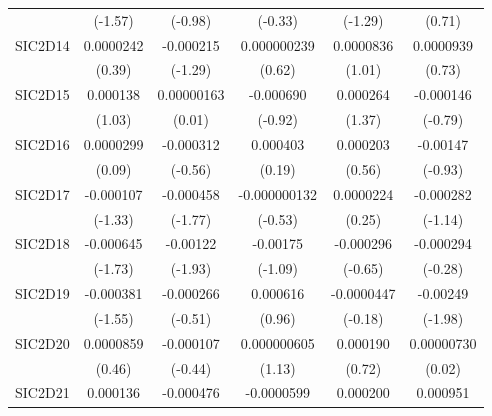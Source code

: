 \begin{table}[htbp]
\begin{tabular}{l*{5}{c}}
            &     (-1.57)         &     (-0.98)         &     (-0.33)         &     (-1.29)         &      (0.71)         \\
SIC2D14     &   0.0000242         &   -0.000215         & 0.000000239         &   0.0000836         &   0.0000939         \\
            &      (0.39)         &     (-1.29)         &      (0.62)         &      (1.01)         &      (0.73)         \\
SIC2D15     &    0.000138         &  0.00000163         &   -0.000690         &    0.000264         &   -0.000146         \\
            &      (1.03)         &      (0.01)         &     (-0.92)         &      (1.37)         &     (-0.79)         \\
SIC2D16     &   0.0000299         &   -0.000312         &    0.000403         &    0.000203         &    -0.00147         \\
            &      (0.09)         &     (-0.56)         &      (0.19)         &      (0.56)         &     (-0.93)         \\
SIC2D17     &   -0.000107         &   -0.000458         &-0.000000132         &   0.0000224         &   -0.000282         \\
            &     (-1.33)         &     (-1.77)         &     (-0.53)         &      (0.25)         &     (-1.14)         \\
SIC2D18     &   -0.000645         &    -0.00122         &    -0.00175         &   -0.000296         &   -0.000294         \\
            &     (-1.73)         &     (-1.93)         &     (-1.09)         &     (-0.65)         &     (-0.28)         \\
SIC2D19     &   -0.000381         &   -0.000266         &    0.000616         &  -0.0000447         &    -0.00249\sym{*}  \\
            &     (-1.55)         &     (-0.51)         &      (0.96)         &     (-0.18)         &     (-1.98)         \\
SIC2D20     &   0.0000859         &   -0.000107         & 0.000000605         &    0.000190         &  0.00000730         \\
            &      (0.46)         &     (-0.44)         &      (1.13)         &      (0.72)         &      (0.02)         \\
SIC2D21     &    0.000136         &   -0.000476         &  -0.0000599         &    0.000200         &    0.000951         \\

\end{tabular}
\end{table}
